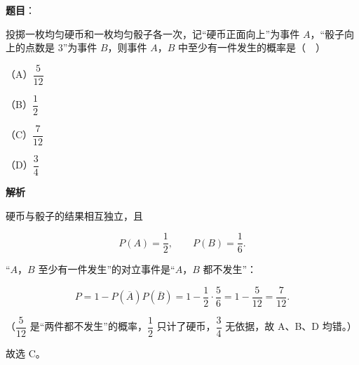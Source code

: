 \begin{answer}

\textbf{题目}：

投掷一枚均匀硬币和一枚均匀骰子各一次，记“硬币正面向上”为事件 $A$，“骰子向上的点数是 $3$”为事件 $B$，则事件 $A$，$B$ 中至少有一件发生的概率是（　）

（A）$\dfrac{5}{12}$

（B）$\dfrac12$

（C）$\dfrac{7}{12}$

（D）$\dfrac34$

\textbf{解析}

硬币与骰子的结果相互独立，且

\nopagebreak[4]
\[P(A)=\frac12,\qquad P(B)=\frac16.\]

“$A$，$B$ 至少有一件发生”的对立事件是“$A$，$B$ 都不发生”：

\nopagebreak[4]
\[P=1-P(\overline A)P(\overline B)=1-\frac12\cdot\frac56=1-\frac5{12}=\frac7{12}.\]

（$\dfrac{5}{12}$ 是“两件都不发生”的概率，$\dfrac12$ 只计了硬币，$\dfrac34$ 无依据，故 A、B、D 均错。）

故选 C。


\end{answer}
